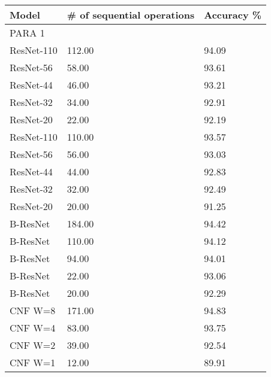 \begin{table}[]
\centering
\begin{tabular}{|lll|}
\hline
Model                       & \# of sequential operations & Accuracy \% \\ \hline \hline
PARA 1                      &                             &             \\ \hline 
ResNet-110                  & 112.00                      & 94.09       \\
ResNet-56                   & 58.00                       & 93.61       \\
ResNet-44                   & 46.00                       & 93.21       \\
ResNet-32                   & 34.00                       & 92.91       \\
ResNet-20                   & 22.00                       & 92.19       \\ \hline
ResNet-110 \cite{DBLP:journals/corr/HeZRS15}      & 110.00                      & 93.57       \\
ResNet-56 \cite{DBLP:journals/corr/HeZRS15}       & 56.00                       & 93.03       \\
ResNet-44 \cite{DBLP:journals/corr/HeZRS15}      & 44.00                       & 92.83       \\
ResNet-32 \cite{DBLP:journals/corr/HeZRS15}      & 32.00                       & 92.49       \\
ResNet-20 \cite{DBLP:journals/corr/HeZRS15}      & 20.00                       & 91.25       \\ \hline
B-ResNet                    & 184.00                      & 94.42       \\
B-ResNet                    & 110.00                      & 94.12       \\
B-ResNet                    & 94.00                       & 94.01       \\
B-ResNet                    & 22.00                       & 93.06       \\
B-ResNet                    & 20.00                       & 92.29       \\ \hline
CNF W=8                     & 171.00                      & 94.83       \\
CNF W=4                     & 83.00                       & 93.75       \\
CNF W=2                     & 39.00                       & 92.54       \\
CNF W=1                     & 12.00                       & 89.91       \\ \hline

\end{tabular}
\end{table}
